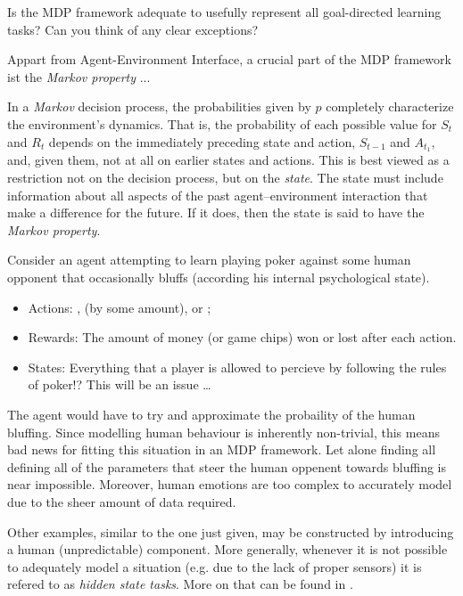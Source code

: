 
\begin{exercise}[Exercise 3.2]

Is the MDP framework adequate to usefully represent all goal-directed learning tasks?
Can you think of any clear exceptions?

\end{exercise}


\begin{solution}

Appart from Agent-Environment Interface, a crucial part of the MDP framework ist the \textit{Markov property} ...

\Quote
{
    In a \textit{Markov} decision process, the probabilities given by $p$ completely characterize the environment's dynamics.
    That is, the probability of each possible value for $S_t$ and $R_t$ depends on the immediately preceding state and action, $S_{t-1}$ and $A_{t_1}$, and, given them, not at all on earlier states and actions.
    This is best viewed as a restriction not on the decision process, but on the \textit{state}.
    The state must include information about all aspects of the past agent–environment interaction that make a difference for the future.
    If it does, then the state is said to have the \textit{Markov property}.
}
\cite*[page 49]{SuttonRichardS2018Rl:a}

Consider an agent attempting to learn playing poker against some human opponent that occasionally bluffs (according his internal psychological state).

\begin{itemize}
    \item Actions:
    ,  (by some amount), or ;
    \item Rewards:
    The amount of money (or game chips) won or lost after each action.
    \item States:
    Everything that a player is allowed to percieve by following the rules of poker!?
    This will be an issue \dots
\end{itemize}

The agent would have to try and approximate the probaility of the human bluffing.
Since modelling human behaviour is inherently non-trivial, this means bad news for fitting this situation in an MDP framework.
Let alone finding all defining all of the parameters that steer the human oppenent towards bluffing is near impossible.
Moreover, human emotions are too complex to accurately model due to the sheer amount of data required.

Other examples, similar to the one just given, may be constructed by introducing a human (unpredictable) component.
More generally, whenever it is not possible to adequately model a situation (e.g. due to the lack of proper sensors) it is refered to as \textit{hidden state tasks}.
More on that can be found in \cite{WhiteheadStevenD1995Rlon}.

\end{solution}

